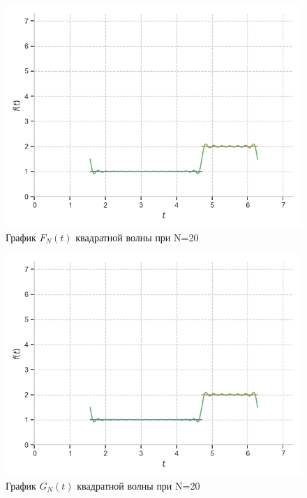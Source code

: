 \documentclass[a4paper, 16pt]{article}
\begin{document}
\newpage
\vspace*{10mm}
\begin{figure}[!htb]
    \centering
    \includegraphics[scale=0.8]{fur_sqwave_n=20.png}
    \captionsetup{skip=0pt}
    \caption{График $F_N(t)$ квадратной волны при N=20}
    \label{Рис:4}
\end{figure}
\begin{figure}[!htb]
    \centering
    \includegraphics[scale=0.8]{cfur_sqwave_n=20.png}
    \captionsetup{skip=0pt}
    \caption{График $G_N(t)$ квадратной волны при N=20}
    \label{Рис:5}
\end{figure}
\newpage
\vspace*{10mm}
\end{document}
